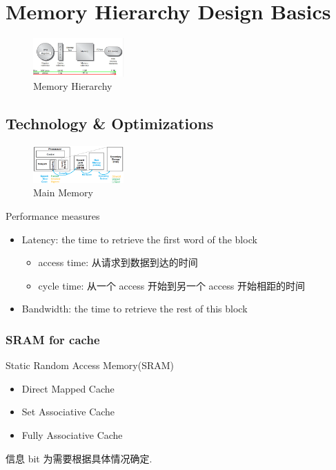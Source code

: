 \newpage
\section{Memory Hierarchy Design Basics}
\begin{figure}[!htb]
    \centering
    \includegraphics[width=0.309\textwidth]{pic/CA2/Memory Hierarchy}
    \caption{Memory Hierarchy}
\end{figure}

\subsection{Technology \& Optimizations}
\begin{figure}[!htb]
    \centering
    \includegraphics[width=0.309\textwidth]{pic/CA2/Main Memory}
    \caption{Main Memory}
\end{figure}

Performance measures
\begin{itemize}
    \item Latency: the time to retrieve the first word of the block
    \begin{itemize}
        \item access time: 从请求到数据到达的时间
        \item cycle time: 从一个 access 开始到另一个 access 开始相距的时间
    \end{itemize}
    \item Bandwidth: the time to retrieve the rest of this block
\end{itemize}

\subsubsection{SRAM for cache}
Static Random Access Memory(SRAM)

\begin{itemize}
    \item Direct Mapped Cache %
    \item Set Associative Cache 
    \item Fully Associative Cache
\end{itemize}
信息 bit 为需要根据具体情况确定. 

